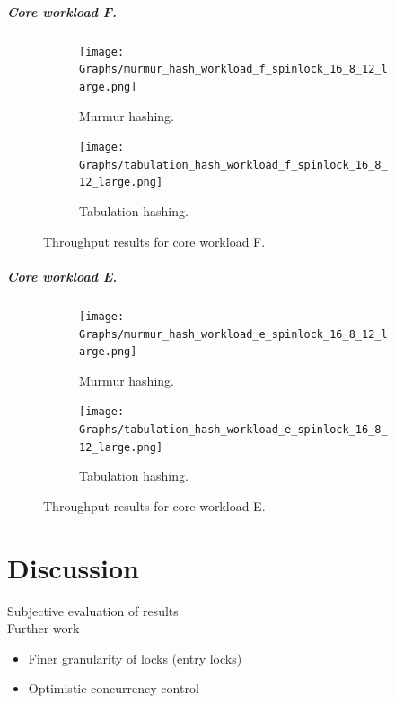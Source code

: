 \documentclass[11pt]{report} %
\begin{document}
\paragraph{Core workload F.} 
\begin{figure}[ht]
  \centering
  \begin{subfigure}[b]{0.45\textwidth}
    \texttt{[image: Graphs/murmur\_hash\_workload\_f\_spinlock\_16\_8\_12\_large.png]}
    \caption[]{Murmur hashing.}
    \label{fig:mur_f}
  \end{subfigure} \hfill
  \begin{subfigure}[b]{0.45\textwidth}
    \texttt{[image: Graphs/tabulation\_hash\_workload\_f\_spinlock\_16\_8\_12\_large.png]}
    \caption[]{Tabulation hashing.}
    \label{fig:tab_f}
  \end{subfigure}
  \caption[]{Throughput results for core workload F.}
  \label{fig:res_f}
\end{figure}

\paragraph{Core workload E.} 
\begin{figure}[ht]
  \centering
  \begin{subfigure}[b]{0.45\textwidth}
    \texttt{[image: Graphs/murmur\_hash\_workload\_e\_spinlock\_16\_8\_12\_large.png]}
    \caption[]{Murmur hashing.}
    \label{fig:mur_e}
  \end{subfigure} \hfill
  \begin{subfigure}[b]{0.45\textwidth}
    \texttt{[image: Graphs/tabulation\_hash\_workload\_e\_spinlock\_16\_8\_12\_large.png]}
    \caption[]{Tabulation hashing.}
    \label{fig:tab_e}
  \end{subfigure}
  \caption[]{Throughput results for core workload E.}
  \label{fig:res_e}
\end{figure}




\chapter{Discussion}
\label{chap:discussion}
Subjective evaluation of results\\
Further work
\begin{itemize}
  \item Finer granularity of locks (entry locks)
  \item Optimistic concurrency control
\end{itemize}
\end{document}

